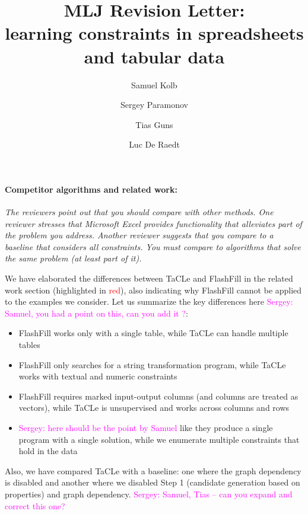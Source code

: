 \documentclass{article}
\author{Samuel Kolb \and Sergey Paramonov \and Tias Guns \and Luc {De Raedt}}
\title{MLJ Revision Letter:\\ learning constraints in spreadsheets and tabular data}
\newcommand{\sergey}[1]{\textcolor{magenta}{{\sc Sergey:} #1}\xspace}
\begin{document}
\maketitle

\paragraph{Competitor algorithms and related work:} \textit{The reviewers point out that you should compare with other methods. One reviewer stresses that Microsoft Excel provides functionality that alleviates part of the problem you address. Another reviewer suggests that you compare to a baseline that considers all constraints. You must compare to algorithms that solve the same problem (at least part of it).}


We have elaborated the differences between TaCLe and FlashFill in the related work section (highlighted in \textcolor{red}{red}), also indicating why FlashFill cannot be applied to the examples we consider. Let us summarize the key differences here \sergey{Samuel, you had a point on this, can you add it ?}:
\begin{itemize}
  \item FlashFill works only with a single table, while TaCLe can handle multiple tables
  \item FlashFill only searches for a string transformation program, while TaCLe works with textual and numeric constraints
  \item FlashFill requires marked input-output columns (and columns are treated as vectors), while TaCLe is unsupervised and works across columns and rows
  \item \sergey{here should be the point by Samuel} like they produce a single program with a single solution, while we enumerate multiple constraints that hold in the data
\end{itemize}


Also, we have compared TaCLe with a baseline: one where the graph dependency is disabled and another where we disabled Step 1 (candidate generation based on properties) and graph dependency. \sergey{Samuel, Tias -- can you expand and correct this one?}
\end{document}

